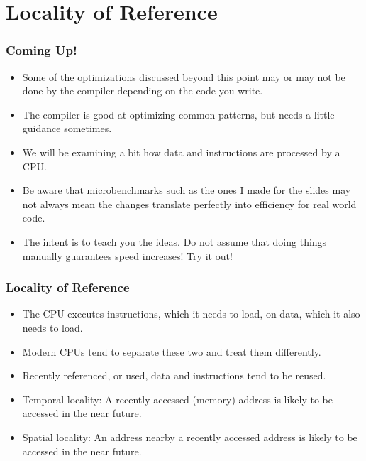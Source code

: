 \documentclass[11pt]{beamer}
\begin{document}
\section*{Locality of Reference}

\begin{frame}[plain]
    \frametitle{Coming Up!}
    \begin{itemize}
        \item<1-> Some of the optimizations discussed beyond this point may or may not be done by the compiler depending on the code you write.
        \item<2-> The compiler is good at optimizing common patterns, but needs a little guidance sometimes.
        \item<3-> We will be examining a bit how data and instructions are processed by a CPU.
        \item<4-> Be aware that microbenchmarks such as the ones I made for the slides may not always mean the changes translate perfectly into efficiency for real world code.
        \item<5-> The intent is to teach you the ideas. Do not assume that doing things manually guarantees speed increases! Try it out!
    \end{itemize}
\end{frame}

\begin{frame}[plain]
    \frametitle{Locality of Reference}
    \begin{itemize}
        \item<1-> The CPU executes instructions, which it needs to load, on data, which it also needs to load.
        \item<2-> Modern CPUs tend to separate these two and treat them differently.
        \item<3-> Recently referenced, or used, data and instructions tend to be reused.
        \item<4-> Temporal locality: A recently accessed (memory) address is likely to be accessed in the near future.
        \item<5-> Spatial locality: An address nearby a recently accessed address is likely to be accessed in the near future.
    \end{itemize}
\end{frame}
\end{document}
